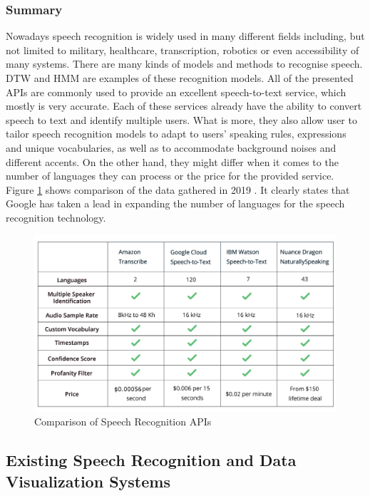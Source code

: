 \documentclass{article}
\begin{document}
\subsubsection{Summary}
{\large
Nowadays speech recognition is widely used in many different fields including, but not limited to military, healthcare, transcription, robotics or even accessibility of many systems. There are many kinds of models and methods to recognise speech. DTW and HMM are examples of these recognition models. All of the presented APIs are commonly used to provide an excellent speech-to-text service, which mostly is very accurate. Each of these services already have the ability to convert speech to text and identify multiple users. What is more, they also allow user to tailor speech recognition models to adapt to users' speaking rules, expressions and unique vocabularies, as well as to accommodate background noises and different accents. On the other hand, they might differ when it comes to the number of languages they can process or the price for the provided service. Figure \ref{fig:table1} shows comparison of the data gathered in 2019 \parencite{table1}. It clearly states that Google has taken a lead in expanding the number of languages for the speech recognition technology.\par

\begin{figure}[H]
  \centering
  \includegraphics[scale=0.50]{img/table1.png}
  \caption{Comparison of Speech Recognition APIs}
  \label{fig:table1}
\end{figure}
}

\subsection{Existing Speech Recognition and Data Visualization Systems}
\end{document}
